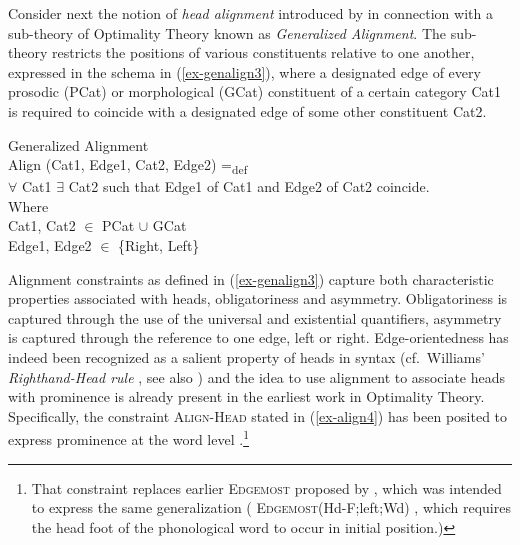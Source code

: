 \documentclass[output=paper
 ,nobabel
 ,draftmode
 ,colorlinks, citecolor=brown
]{langscibook}
\begin{document}
\begin{sloppypar}
Consider next the notion of \emph{head alignment} introduced by \citet{McCarthyPrince1993} in connection with a sub-theory of Optimality Theory known as \emph{Generalized Alignment}. The sub-theory restricts the positions of various constituents relative to one another, expressed in the schema in (\ref{ex-genalign3}), where a designated edge of every prosodic (PCat) or morphological (GCat) constituent of a certain category Cat1 is required to coincide with a designated edge of some other constituent Cat2.
\end{sloppypar}

\ea\label{ex-genalign3}
Generalized Alignment \citep[80]{McCarthyPrince1993}\\
\smallskip
  Align (Cat1, Edge1, Cat2, Edge2)  =\textsubscript{def}\\
  \hphantom{Where} ${\forall}$ Cat1 ${\exists}$ Cat2 such that Edge1 of Cat1 and Edge2 of Cat2 coincide. \\
Where \\
 \hphantom{Where} Cat1, Cat2 ${\in}$ PCat ${\cup}$ GCat\\
 \hphantom{Where} Edge1, Edge2 ${\in}$ \{Right, Left\}
\z

\noindent
Alignment constraints as defined in (\ref{ex-genalign3}) capture both characteristic properties
associated with heads, obligatoriness and asymmetry. Obligatoriness is captured through the use of
the universal and existential quantifiers, asymmetry is captured through the reference to one
edge, left or right. Edge-orientedness has indeed been recognized as a salient property of heads in syntax (cf.\
Williams' \emph{Righthand-Head rule} \citealp{Williams1981}, see also
\citealp{TrommelenZonneveld1986}) and the idea to use alignment to associate heads with prominence
is already present in the earliest work in Optimality Theory. Specifically, the constraint
\textsc{Align-Head} stated in (\ref{ex-align4}) has been posited to express prominence at the word
level \citep[98]{McCarthyPrince1993}.\footnote{That constraint replaces earlier \textsc{Edgemost}
  proposed by \citet{PS2004a-cite}, which was intended to express the same generalization (\eg
  \textsc{Edgemost}(Hd-F;left;Wd) \citealp[34-38]{PS2004a-cite}, which requires the head foot of the
  phonological word to occur in initial position.)}
\end{document}
